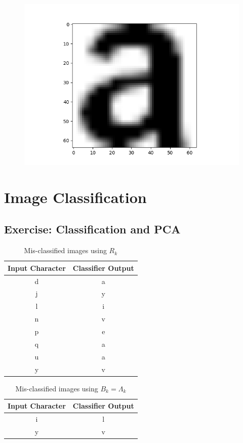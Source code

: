 \documentclass{article}
\begin{document}
\begin{figure}[H]
    \centering
    \includegraphics[width=1\textwidth]{../original-image.png}
\end{figure}

\section{Image Classification}
\subsection{Exercise: Classification and PCA}
\begin{table}[H]
    \centering
    \begin{tabular}{|c|c|}
        \hline
        Input Character & Classifier Output \\
        \hline
        d & a \\
        \hline
        j & y \\
        \hline
        l & i \\
        \hline
        n & v \\
        \hline
        p & e \\
        \hline
        q & a \\
        \hline
        u & a \\
        \hline
        y & v \\
        \hline
    \end{tabular}
    \caption{Mis-classified images using $R_k$}
\end{table}

\begin{table}[H]
    \centering
    \begin{tabular}{|c|c|}
        \hline
        Input Character & Classifier Output \\
        \hline
        i & l \\
        \hline
        y & v \\
        \hline
    \end{tabular}
    \caption{Mis-classified images using $B_k = \Lambda_k$}
\end{table}
\end{document}
